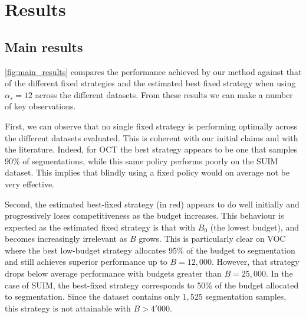 \section{Results}
\label{sec:fullweak_results}

\subsection{Main results}
\cref{fig:main_results} compares the performance achieved by our method against that of the different fixed strategies and the estimated best fixed strategy when using $\alpha_s = 12$ across the different datasets. From these results we can make a number of key observations. 

First, we can observe that no single fixed strategy is performing optimally across the different datasets evaluated. This is coherent with our initial claims and with the literature. Indeed, for OCT the best strategy appears to be one that samples 90\% of segmentations, while this same policy performs poorly on the SUIM dataset. This implies that blindly using a fixed policy would on average not be very effective.

Second, the estimated best-fixed strategy (in red) appears to do well initially and progressively loses competitiveness as the budget increases. This behaviour is expected as the estimated fixed strategy is that with $B_0$ (the lowest budget), and becomes increasingly irrelevant as $B$ grows. This is particularly clear on VOC where the best low-budget strategy allocates 95\% of the budget to segmentation and still achieves superior performance up to $B=12,000$. However, that strategy drops below average performance with budgets greater than $B=25,000$. In the case of SUIM, the best-fixed strategy corresponds to 50\% of the budget allocated to segmentation. Since the dataset contains only $1,525$ segmentation samples, this strategy is not attainable with $B > 4'000$.

